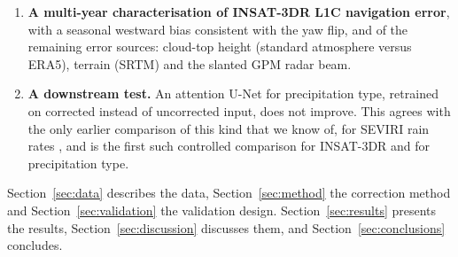 \begin{enumerate}
  \item \textbf{A multi-year characterisation of INSAT-3DR L1C navigation error}, with a seasonal westward bias consistent with the yaw flip, and of the remaining error sources: cloud-top height (standard atmosphere versus ERA5), terrain (SRTM) and the slanted GPM radar beam.
  \item \textbf{A downstream test.} An attention U-Net for precipitation type, retrained on corrected instead of uncorrected input, does not improve. This agrees with the only earlier comparison of this kind that we know of, for SEVIRI rain rates \citep{dadderio2023}, and is the first such controlled comparison for INSAT-3DR and for precipitation type.
\end{enumerate}

Section~\ref{sec:data} describes the data, Section~\ref{sec:method} the correction method and Section~\ref{sec:validation} the validation design. Section~\ref{sec:results} presents the results, Section~\ref{sec:discussion} discusses them, and Section~\ref{sec:conclusions} concludes.
